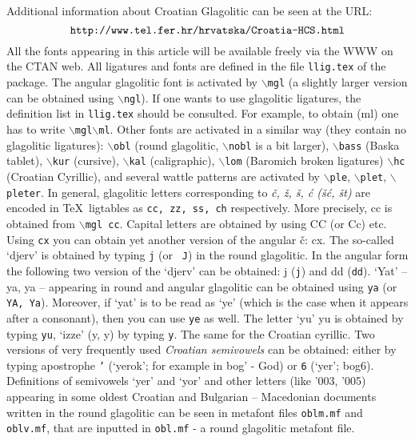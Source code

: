\noindent Additional information about Croatian Glagolitic can be
seen at the URL:
$$
\text{\tt http://www.tel.fer.hr/hrvatska/Croatia-HCS.html}
$$
All  the fonts appearing in this article will be available
 freely  via the WWW on  the CTAN web.
All ligatures and fonts are defined in the file {\tt llig.tex} of the
package.
 The angular glagolitic font is activated by
{\tt$\backslash$mgl} (a slightly larger version can be obtained using
{\tt$\backslash$ngl}).
If one wants to use glagolitic
ligatures, the definition list in {\tt llig.tex} should be
consulted. For example, to obtain {\mgl\ml} (ml) one has to write
{\tt$\backslash$mgl$\backslash$ml}. Other fonts are
activated in a similar way (they contain no glagolitic
ligatures): {\tt$\backslash$obl} (round glagolitic,
{\tt$\backslash$nobl} is a bit larger),
{\tt$\backslash$bass} (Baska tablet),
{\tt$\backslash$kur} (cursive),
{\tt$\backslash$kal} (caligraphic),
{\tt$\backslash$lom} (Baromich broken ligatures)
{\tt$\backslash$hc} (Croatian Cyrillic),
and several wattle
patterns are activated by
{\tt$\backslash$ple},
{\tt$\backslash$plet},
{\tt$\backslash$pleter}.
In general, glagolitic letters corresponding to {\it \v c, \v z,
\v s, \'c (\v s\'c, \v st)} are encoded in \TeX\ ligtables as {\tt cc,
zz, ss, ch} respectively. More precisely, \hbox{{\mgl cc}} is
obtained from {\tt$\backslash$mgl cc}.
Capital letters are obtained by using CC (or Cc) etc.
Using {\tt cx} you can obtain yet another version of the
angular \v c: \hbox{{\mgl cx}}.
The so-called `djerv' is obtained by typing  {\tt j} (or {\tt
J}) in the
round glagolitic. In the angular form the following two version of the
`djerv' can be obtained:
  {\mgl j} ({\tt j}) and \hbox{{\mgl dd}} ({\tt dd}).
  `Yat' -- \hbox{\mobl ya}, \hbox{\mgl ya} -- appearing in round and angular
  glagolitic  can be obtained using {\tt ya} (or {\tt YA,
  Ya}).
  Moreover, if `yat' is to be read as `ye' (which is the
  case when it
  appears after a consonant), then you can use {\tt ye} as
  well.
  The letter `yu' {\mgl yu} is obtained by typing {\tt yu},
  `izze' ({\obl y}, {\mgl y}) by typing {\tt y}.
  The same for the Croatian cyrillic. Two versions of
   very frequently used   {\it Croatian semivowels\/} can be obtained:
  either  by typing apostrophe {\tt '} (`yerok'; for example
  in {\mgl bog'} - God) or
  {\tt6} (`yer'; {\mgl bog6}). Definitions  of semivowels
  `yer' and `yor' and other letters (like
{\mobl\char'003,  \char'005}) appearing in some oldest Croatian and Bulgarian --
  Macedonian  documents written in the round glagolitic
  can be seen in  metafont files {\tt oblm.mf} and {\tt
  oblv.mf}, that are inputted  in {\tt obl.mf} - a round glagolitic
  metafont file.

